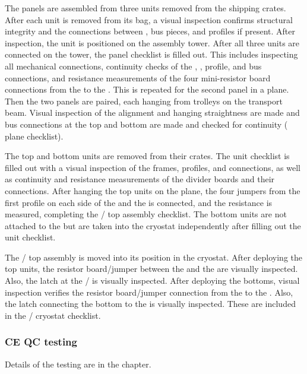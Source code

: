 The  panels are assembled from three units removed from the shipping crates.  
After each unit is removed from its bag, a visual inspection confirms structural integrity and the connections between ,  bus pieces, and profiles if present.  
After inspection, the unit is positioned on the  assembly tower.  
After all three units are connected on the tower, the  panel checklist is filled out.  
This includes inspecting all mechanical connections, continuity checks of the , , profile, and  bus connections, and resistance measurements of the four mini-resistor board connections from the  to the .  
This is repeated for the second panel in a  plane.  Then the two panels are paired, each hanging from trolleys on the transport beam.  
Visual inspection of the alignment and hanging straightness are made and  bus connections at the top and bottom are made and checked for continuity ( plane checklist).

The  top and bottom units are removed from their crates.  The  unit checklist is filled out with a visual inspection of the frames, profiles, and connections, as well as continuity and resistance measurements of the divider boards and their connections.  
After hanging the top  units on the  plane, the four jumpers from the first  profile on each side of the  and the   is connected, and the resistance is measured, completing the / top assembly checklist. 
The  bottom units are not attached to the  but are taken into the cryostat independently after filling out the  unit checklist.

The / top assembly is moved into its position in the cryostat.   
After deploying the  top units, the resistor board/jumper between the  and the   are visually inspected.  
Also, the latch at the / is visually inspected.  After deploying the  bottoms, visual inspection verifies the resistor board/jumper connection from the  to the .  
Also, the latch connecting the  bottom to the  is visually inspected.  
These are included in the / cryostat checklist.

\subsubsection{CE QC testing}
Details of the   testing are  in the  chapter.

